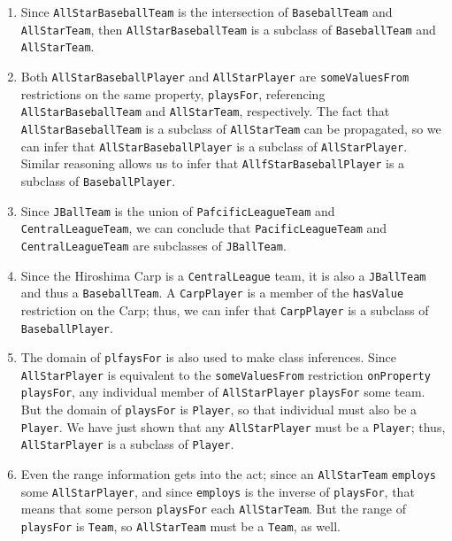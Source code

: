 \begin{enumerate}
\item Since \texttt{AllStarBaseballTeam} is the intersection of \texttt{BaseballTeam} and
\texttt{AllStarTeam}, then \texttt{AllStarBaseballTeam} is a subclass of \texttt{BaseballTeam} and
\texttt{AllStarTeam}.

\item  Both \texttt{AllStarBaseballPlayer} and \texttt{AllStarPlayer} are \texttt{someValuesFrom}
restrictions
on the same property, \texttt{playsFor}, referencing \texttt{AllStarBaseballTeam} and
\texttt{AllStarTeam}, respectively. The fact that \texttt{AllStarBaseballTeam} is a
subclass of \texttt{AllStarTeam} can be propagated, so we can infer that
\texttt{AllStarBaseballPlayer} is a subclass of \texttt{AllStarPlayer}. Similar reasoning
allows us to infer that \texttt{AllfStarBaseballPlayer} is a subclass of
\texttt{BaseballPlayer}. \label{tbox}

\item  Since \texttt{JBallTeam} is the union of \texttt{PafcificLeagueTeam} and
\texttt{CentralLeagueTeam}, we can
conclude that \texttt{PacificLeagueTeam} and \texttt{CentralLeagueTeam} are subclasses of
\texttt{JBallTeam}.

\item Since the Hiroshima Carp is a \texttt{CentralLeague} team, it is also a
\texttt{JBallTeam} and thus a \texttt{BaseballTeam}. A \texttt{CarpPlayer} is a member of the \texttt{hasValue}
restriction on the Carp; thus, we can infer that \texttt{CarpPlayer} is a
subclass of \texttt{BaseballPlayer}.

\item The domain of \texttt{plfaysFor} is also used to make class inferences. Since
\texttt{AllStarPlayer} is
equivalent to the \texttt{someValuesFrom} restriction \texttt{onProperty} \texttt{playsFor}, any
individual member of \texttt{AllStarPlayer} \texttt{playsFor} some team. But the domain of
\texttt{playsFor} is \texttt{Player}, so that individual must also be a \texttt{Player}. We have
just shown that any \texttt{AllStarPlayer} must be a \texttt{Player}; thus, \texttt{AllStarPlayer}
is a subclass of \texttt{Player}.

\item Even the range information gets into the act; since an \texttt{AllStarTeam}
\texttt{employs} some
\texttt{AllStarPlayer}, and since \texttt{employs} is the inverse of \texttt{playsFor}, that means
that some person \texttt{playsFor} each \texttt{AllStarTeam}. But the range of \texttt{playsFor} is
\texttt{Team}, so \texttt{AllStarTeam} must be a \texttt{Team}, as well.


\end{enumerate}

